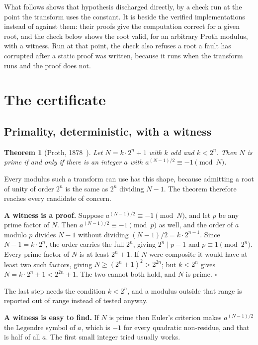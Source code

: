 \documentclass{article}
\newtheorem{theorem}{Theorem}
\begin{document}
What follows shows that hypothesis discharged directly, by a check run at the point the transform uses the constant. It is beside the verified implementations instead of against them: their proofs give the computation correct for a given root, and the check below shows the root valid, for an arbitrary Proth modulus, with a witness. Run at that point, the check also refuses a root a fault has corrupted after a static proof was written, because it runs when the transform runs and the proof does not.

\section{The certificate}

\subsection{Primality, deterministic, with a witness}

\begin{theorem}[Proth, 1878~\cite{proth}]
Let \(N = k \cdot 2^n + 1\) with \(k\) odd and \(k < 2^n\). Then \(N\) is prime if and only if there is an integer \(a\) with \(a^{(N-1)/2} \equiv -1 \pmod N\).
\end{theorem}

Every modulus such a transform can use has this shape, because admitting a root of unity of order \(2^n\) is the same as \(2^n\) dividing \(N-1\). The theorem therefore reaches every candidate of concern.

\textbf{A witness is a proof.} Suppose \(a^{(N-1)/2} \equiv -1 \pmod N\), and let \(p\) be any prime factor of \(N\). Then \(a^{(N-1)/2} \equiv -1 \pmod p\) as well, and the order of \(a\) modulo \(p\) divides \(N-1\) without dividing \((N-1)/2 = k \cdot 2^{n-1}\). Since \(N - 1 = k \cdot 2^n\), the order carries the full \(2^n\), giving \(2^n \mid p-1\) and \(p \equiv 1 \pmod{2^n}\). Every prime factor of \(N\) is at least \(2^n + 1\). If \(N\) were composite it would have at least two such factors, giving \(N \ge (2^n+1)^2 > 2^{2n}\); but \(k < 2^n\) gives \(N = k \cdot 2^n + 1 < 2^{2n} + 1\). The two cannot both hold, and \(N\) is prime. \(\square\)

The last step needs the condition \(k < 2^n\), and a modulus outside that range is reported out of range instead of tested anyway.

\textbf{A witness is easy to find.} If \(N\) is prime then Euler's criterion makes \(a^{(N-1)/2}\) the Legendre symbol of \(a\), which is \(-1\) for every quadratic non-residue, and that is half of all \(a\). The first small integer tried usually works.
\end{document}
